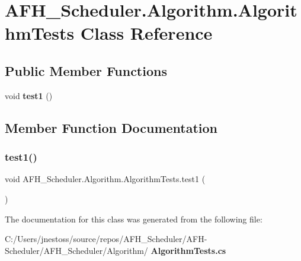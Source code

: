 \section{A\+F\+H\+\_\+\+Scheduler.\+Algorithm.\+Algorithm\+Tests Class Reference}
\label{class_a_f_h___scheduler_1_1_algorithm_1_1_algorithm_tests}
\subsection*{Public Member Functions}
\begin{DoxyCompactItemize}
\item 
void \textbf{ test1} ()
\end{DoxyCompactItemize}


\subsection{Member Function Documentation}
\mbox{\label{class_a_f_h___scheduler_1_1_algorithm_1_1_algorithm_tests_ab086da1c8df5b255ca6581cb734cb035}} 
\subsubsection{test1()}
{\footnotesize\ttfamily void A\+F\+H\+\_\+\+Scheduler.\+Algorithm.\+Algorithm\+Tests.\+test1 (\begin{DoxyParamCaption}{ }\end{DoxyParamCaption})}



The documentation for this class was generated from the following file\+:\begin{DoxyCompactItemize}
\item 
C\+:/\+Users/jnestoss/source/repos/\+A\+F\+H\+\_\+\+Scheduler/\+A\+F\+H-\/\+Scheduler/\+A\+F\+H\+\_\+\+Scheduler/\+Algorithm/\textbf{ Algorithm\+Tests.\+cs}\end{DoxyCompactItemize}
